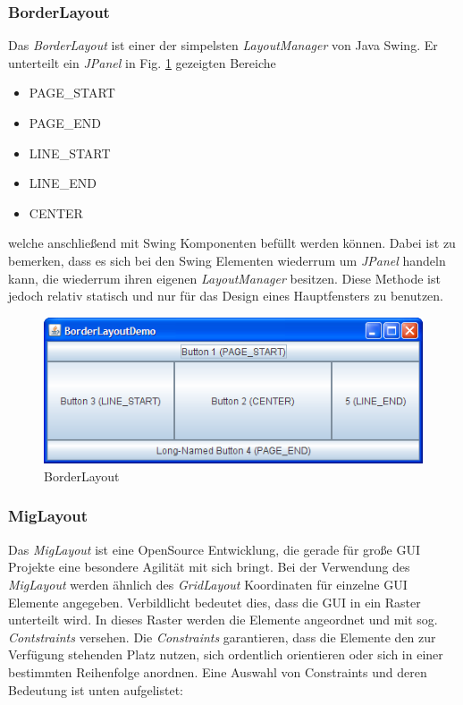 \documentclass[a4paper, 11pt]{article} %
\begin{document}
\subsubsection{BorderLayout}
Das \emph{BorderLayout} ist einer der simpelsten \emph{LayoutManager} von Java Swing. Er unterteilt ein \emph{JPanel} in Fig. \ref{fig:borderlayout} gezeigten Bereiche
\begin{itemize}
    \item {PAGE\_START}
    \item {PAGE\_END}
    \item {LINE\_START}
    \item {LINE\_END}
    \item {CENTER}
\end{itemize}
welche anschließend mit Swing Komponenten befüllt werden können. Dabei ist zu bemerken, dass es sich bei den Swing Elementen wiederrum um \emph{JPanel} handeln kann, die wiederrum ihren eigenen \emph{LayoutManager} besitzen. Diese Methode ist jedoch relativ statisch und nur für das Design eines Hauptfensters zu benutzen.

\begin{figure}[!htp]
\includegraphics[width=\textwidth]{img/BorderLayoutDemo}
\caption{BorderLayout}
\label{fig:borderlayout}
\end{figure}

\subsubsection{MigLayout}
Das \emph{MigLayout} ist eine OpenSource Entwicklung, die gerade für große GUI Projekte eine besondere Agilität mit sich bringt. Bei der Verwendung des \emph{MigLayout} werden ähnlich des \emph{GridLayout} Koordinaten für einzelne GUI Elemente angegeben. Verbildlicht bedeutet dies, dass die GUI in ein Raster unterteilt wird. In dieses Raster werden die Elemente angeordnet und mit sog. \emph{Contstraints} versehen. Die \emph{Constraints} garantieren, dass die Elemente den zur Verfügung stehenden Platz nutzen, sich ordentlich orientieren oder sich in einer bestimmten Reihenfolge anordnen. Eine Auswahl von Constraints und deren Bedeutung ist unten aufgelistet:
\end{document}
